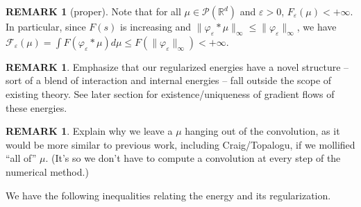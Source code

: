 \documentclass[11pt,leqno]{amsart}
\theoremstyle{definition}
\newtheorem{remark}[thm]{REMARK}
\newcommand{\Rd}{{\mathord{\mathbb R}^d}}
\newcommand{\F}{\mathcal{F}}
\def\P{{\mathcal P}}
\def\epsilon{\varepsilon}
\def\e{\varepsilon}
\def\F{\mathcal{F}}
\begin{document}
\begin{remark}[proper]
Note that for all $\mu \in \P(\Rd)$ and $\epsilon >0$, $F_\e(\mu) <+\infty$. In particular, since $F(s)$ is increasing and $\|\varphi_\e*\mu\|_\infty \leq \|\varphi_\e\|_\infty$, we have $\F_\e(\mu) = \int F(\varphi_\e*\mu) d\mu \leq F(\|\varphi_\e\|_\infty) < +\infty$.
\end{remark}

{\color{Aquamarine}  \begin{remark} \label{novelstructure}
Emphasize that our regularized energies have a novel structure -- sort of a blend of interaction and internal energies -- fall outside the scope of existing theory. See later section for existence/uniqueness of gradient flows of these energies.
\end{remark}}


{\color{Aquamarine}  \begin{remark} \label{whyconvolution}
Explain why we leave a $\mu$ hanging out of the convolution, as it would be more similar to previous work, including Craig/Topalogu, if we mollified ``all of'' $\mu$. (It's so we don't have to compute a convolution at every step of the numerical method.)
\end{remark}}





We have the following inequalities relating the energy and its regularization.
\end{document}
